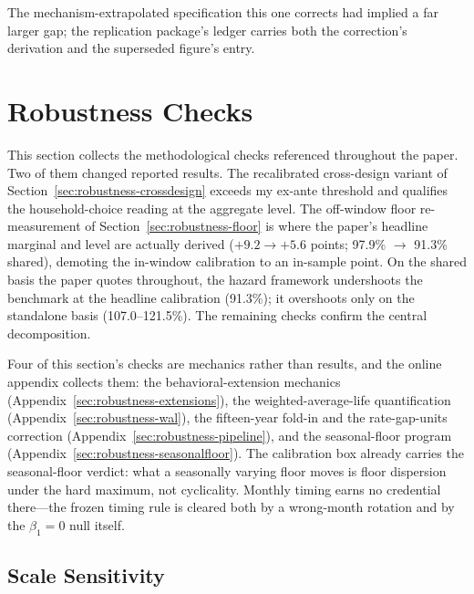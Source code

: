 \documentclass[12pt]{article}
\begin{document}
The mechanism-extrapolated specification this one corrects had implied a far larger gap; the replication package's ledger carries both the correction's derivation and the superseded figure's entry.

\section{Robustness Checks}\label{sec:robustness}

This section collects the methodological checks referenced throughout the paper. Two of them changed reported results. The recalibrated cross-design variant of Section~\ref{sec:robustness-crossdesign} exceeds my ex-ante threshold and qualifies the household-choice reading at the aggregate level. The off-window floor re-measurement of Section~\ref{sec:robustness-floor} is where the paper's headline marginal and level are actually derived ($+9.2 \to +5.6$ points; 97.9\% $\to$ 91.3\% shared), demoting the in-window calibration to an in-sample point. On the shared basis the paper quotes throughout, the hazard framework undershoots the benchmark at the headline calibration (91.3\%); it overshoots only on the standalone basis (107.0--121.5\%). The remaining checks confirm the central decomposition.

Four of this section's checks are mechanics rather than results, and the online appendix collects them: the behavioral-extension mechanics (Appendix~\ref{sec:robustness-extensions}), the weighted-average-life quantification (Appendix~\ref{sec:robustness-wal}), the fifteen-year fold-in and the rate-gap-units correction (Appendix~\ref{sec:robustness-pipeline}), and the seasonal-floor program (Appendix~\ref{sec:robustness-seasonalfloor}). The calibration box already carries the seasonal-floor verdict: what a seasonally varying floor moves is floor dispersion under the hard maximum, not cyclicality. Monthly timing earns no credential there---the frozen timing rule is cleared both by a wrong-month rotation and by the $\beta_1 = 0$ null itself.

\subsection{Scale Sensitivity}\label{sec:robustness-scale}
\end{document}
